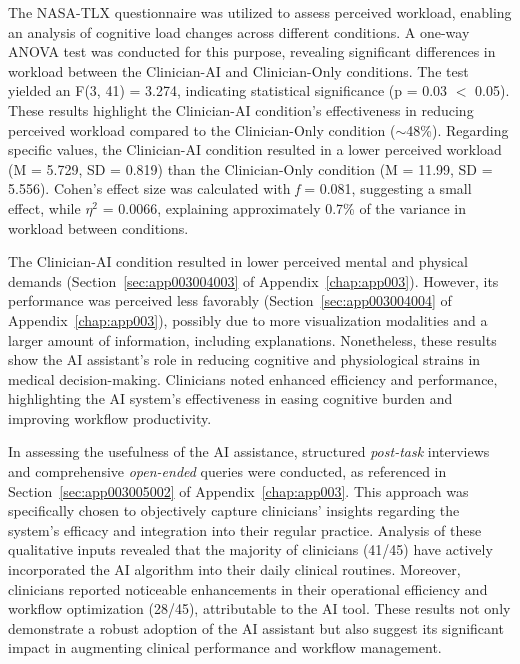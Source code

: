 \textcolor{revised}{The \ac{NASA-TLX} questionnaire was utilized to assess perceived workload, enabling an analysis of cognitive load changes across different conditions.
A one-way \ac{ANOVA} test was conducted for this purpose, revealing significant differences in workload between the Clinician-AI and Clinician-Only conditions.
The test yielded an F(3, 41) = 3.274, indicating statistical significance (p = 0.03 $<$ 0.05).
These results highlight the Clinician-AI condition's effectiveness in reducing perceived workload compared to the Clinician-Only condition ($\sim$48\%).
Regarding specific values, the Clinician-AI condition resulted in a lower perceived workload (M = 5.729, SD = 0.819) than the Clinician-Only condition (M = 11.99, SD = 5.556).
Cohen's effect size was calculated with {\it f} = 0.081, suggesting a small effect, while $\eta^{2}$ = 0.0066, explaining approximately 0.7\% of the variance in workload between conditions.}

\textcolor{revised}{The Clinician-AI condition resulted in lower perceived mental and physical demands (Section~\ref{sec:app003004003} of Appendix~\ref{chap:app003}).
However, its performance was perceived less favorably (Section~\ref{sec:app003004004} of Appendix~\ref{chap:app003}), possibly due to more visualization modalities and a larger amount of information, including explanations.
Nonetheless, these results show the \ac{AI} assistant's role in reducing cognitive and physiological strains in medical decision-making.
Clinicians noted enhanced efficiency and performance, highlighting the \ac{AI} system's effectiveness in easing cognitive burden and improving workflow productivity.}

In assessing the usefulness of the \ac{AI} assistance, structured {\it post-task} interviews and comprehensive {\it open-ended} queries were conducted, as referenced in Section~\ref{sec:app003005002} of Appendix~\ref{chap:app003}.
This approach was specifically chosen to objectively capture clinicians' insights regarding the system's efficacy and integration into their regular practice.
Analysis of these qualitative inputs revealed that the majority of clinicians (41/45) have actively incorporated the \ac{AI} algorithm into their daily clinical routines.
Moreover, clinicians reported noticeable enhancements in their operational efficiency and workflow optimization (28/45), attributable to the \ac{AI} tool.
These results not only demonstrate a robust adoption of the \ac{AI} assistant but also suggest its significant impact in augmenting clinical performance and workflow management.

